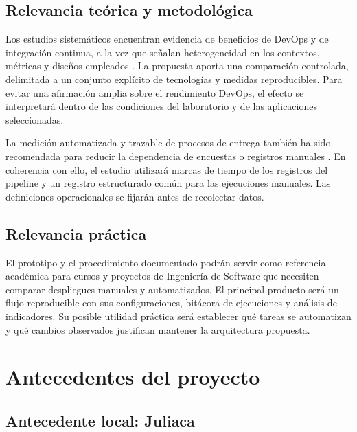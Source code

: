 \documentclass[12pt,a4paper]{article}
\begin{document}
\subsection{Relevancia teórica y metodológica}

Los estudios sistemáticos encuentran evidencia de beneficios de DevOps y de integración continua, a la vez que señalan heterogeneidad en los contextos, métricas y diseños empleados \citep{faustino2022,soares2022,amaro2025}. La propuesta aporta una comparación controlada, delimitada a un conjunto explícito de tecnologías y medidas reproducibles. Para evitar una afirmación amplia sobre el rendimiento DevOps, el efecto se interpretará dentro de las condiciones del laboratorio y de las aplicaciones seleccionadas.

La medición automatizada y trazable de procesos de entrega también ha sido recomendada para reducir la dependencia de encuestas o registros manuales \citep{sallin2021}. En coherencia con ello, el estudio utilizará marcas de tiempo de los registros del pipeline y un registro estructurado común para las ejecuciones manuales. Las definiciones operacionales se fijarán antes de recolectar datos.

\subsection{Relevancia práctica}

El prototipo y el procedimiento documentado podrán servir como referencia académica para cursos y proyectos de Ingeniería de Software que necesiten comparar despliegues manuales y automatizados. El principal producto será un flujo reproducible con sus configuraciones, bitácora de ejecuciones y análisis de indicadores. Su posible utilidad práctica será establecer qué tareas se automatizan y qué cambios observados justifican mantener la arquitectura propuesta.

\section{Antecedentes del proyecto}

\subsection{Antecedente local: Juliaca}
\end{document}
